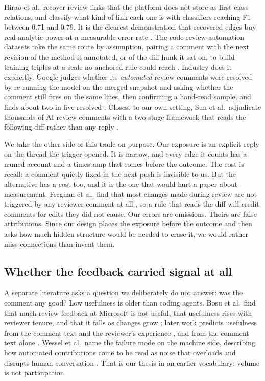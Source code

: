 \documentclass[lineno,pdflatex,sn-basic]{sn-jnl}
\begin{document}
Hirao et al.\ recover review links that the platform does not store as
first-class relations, and classify what kind of link each one is with
classifiers reaching F1 between 0.71 and 0.79. It is the clearest
demonstration that recovered edges buy real analytic power at a measurable
error rate \citep{hirao2019linkage}. The code-review-automation datasets take the same
route by assumption, pairing a comment with the next revision of the method it annotated, or of the diff hunk it sat on, to build training triples at a scale no anchored rule could reach \citep{tufano2022pretrained,li2022codereviewer}. Industry does it explicitly.
Google judges whether its \emph{automated} review comments were resolved by
re-running the model on the merged snapshot and asking whether the comment
still fires on the same lines, then confirming a hand-read sample, and finds
about two in five resolved \citep{vijayvergiya2024autocommenter,
frommgen2024resolving}. Closest to our own setting, Sun et al.\ adjudicate
thousands of AI review comments with a two-stage framework that reads the
following diff rather than any reply \citep{sun2026aicodereview}.

We take the other side of this trade on purpose. Our exposure is an explicit
reply on the thread the trigger opened. It is narrow, and every edge it counts
has a named account and a timestamp that comes before the outcome. The cost is
recall: a comment quietly fixed in the next push is invisible to us. But the
alternative has a cost too, and it is the one that would hurt a paper about
measurement. Fregnan et al.\ find that most changes made during review are not
triggered by any reviewer comment at all \citep{fregnan2022reviewchanges}, so a
rule that reads the diff will credit comments for edits they did not cause. Our
errors are omissions. Theirs are false attributions. Since our design places the
exposure before the outcome and then asks how much hidden structure would be
needed to erase it, we would rather miss connections than invent them.

\subsection{Whether the feedback carried signal at all}

A separate literature asks a question we deliberately do not answer: was the
comment any good? Low usefulness is older than coding agents. Bosu et al.\ find
that much review feedback at Microsoft is not useful, that usefulness rises with
reviewer tenure, and that it falls as changes grow \citep{bosu2015useful}; later work predicts usefulness from the comment text and the reviewer's experience \citep{rahman2017usefulness}, and from the comment text alone \citep{ahmed2025useful}. Wessel et al.\ name the failure
mode on the machine side, describing how automated contributions come to be read as noise that overloads and disrupts human conversation \citep{wessel2021noise}. That is our
thesis in an earlier vocabulary: volume is not participation.
\end{document}
